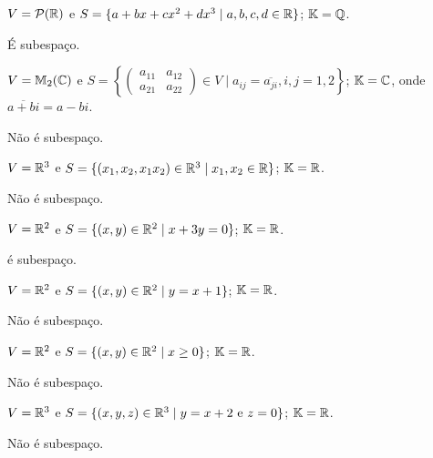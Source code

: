 \documentclass[12pt]{exam}
\begin{document}
\begin{exercicio}
    $V = \mathcal{P}(\mathbb{R})$ e $S = \{a + bx + cx^2 + dx^3\mid a, b, c, d \in \mathbb{R}\}$; $\mathbb{K} = \mathbb{Q}$.
    \begin{solucao}
      É subespaço.
    \end{solucao}
\end{exercicio}

\begin{exercicio}
  $V = \mathbb{M}_2(\mathbb{C})$ e $S = \left\{\begin{pmatrix} a_{11} & a_{12}\\ a_{21} & a_{22}\end{pmatrix} \in V \mid a_{ij} = \overline{a_{ji}}, i, j = 1, 2\right\}$; $\mathbb{K} = \mathbb{C}$, onde $\overline{a + bi} = a - bi$.
  \begin{solucao}
    Não é subespaço.
  \end{solucao}
\end{exercicio}

\begin{exercicio}
  $V = \mathbb{R}^3$ e $S = \{(x_1, x_2, x_1x_2) \in \mathbb{R}^3 \mid x_1, x_2 \in \mathbb{R}\}$; $\mathbb{K} = \mathbb{R}$.
  \begin{solucao}
    Não é subespaço.
  \end{solucao}
\end{exercicio}

\begin{exercicio}
  $V = \mathbb{R}^2$ e $S = \{(x, y) \in \mathbb{R}^2 \mid x + 3y = 0\}$; $\mathbb{K} = \mathbb{R}$.
  \begin{solucao}
    é subespaço.
  \end{solucao}
\end{exercicio}

\begin{exercicio}
  $V = \mathbb{R}^2$ e $S = \{(x, y) \in \mathbb{R}^2 \mid y = x + 1\}$; $\mathbb{K} = \mathbb{R}$.
  \begin{solucao}
    Não é subespaço.
  \end{solucao}
\end{exercicio}

\begin{exercicio}
  $V = \mathbb{R}^2$ e $S = \{(x, y) \in \mathbb{R}^2 \mid x \ge 0\}$; $\mathbb{K} = \mathbb{R}$.
  \begin{solucao}
    Não é subespaço.
  \end{solucao}
\end{exercicio}

\begin{exercicio}
  $V = \mathbb{R}^3$ e $S = \{(x, y, z) \in \mathbb{R}^3 \mid y = x + 2 \mbox{ e } z = 0\}$; $\mathbb{K} = \mathbb{R}$.
  \begin{solucao}
    Não é subespaço.
  \end{solucao}
\end{exercicio}
\end{document}
